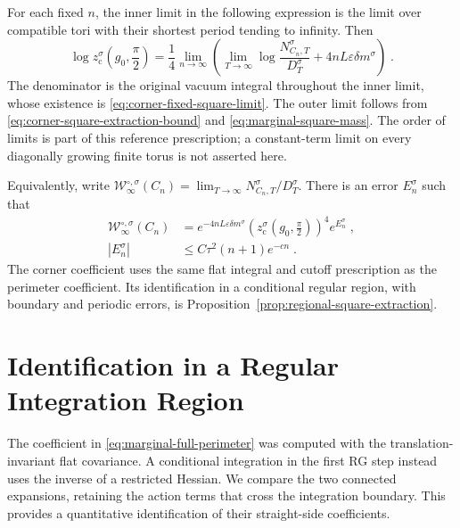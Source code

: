 \documentclass[11pt]{article}
\begin{document}
For each fixed $n$, the inner limit in the following expression is the limit over compatible tori with their shortest period tending to infinity. Then
\begin{equation}\label{eq:corner-ratio-limit}
    \boxed{\displaystyle
        \log z_{\mathrm c}^{\sigma}\!\left(g_0,\frac{\pi}{2}\right)
            =\frac{1}{4}\lim_{n\to\infty}
                \left(\lim_{T\to\infty}
                    \log\frac{N_{C_n,T}^{\sigma}}{D_T^{\sigma}}
                    +4nL\varepsilon\delta m^{\sigma}\right)}\;.
\end{equation}
The denominator is the original vacuum integral throughout the inner limit, whose existence is \eqref{eq:corner-fixed-square-limit}. The outer limit follows from \eqref{eq:corner-square-extraction-bound} and \eqref{eq:marginal-square-mass}. The order of limits is part of this reference prescription; a constant-term limit on every diagonally growing finite torus is not asserted here.

Equivalently, write $\mathcal W_\infty^{\circ,\sigma}(C_n)=\lim_{T\to\infty}N_{C_n,T}^{\sigma}/D_T^{\sigma}$. There is an error $E_n^{\sigma}$ such that
\begin{equation}\label{eq:corner-reference-matching}
    \begin{aligned}
        \mathcal W_\infty^{\circ,\sigma}(C_n)
            &=e^{-4nL\varepsilon\delta m^{\sigma}}
                \left(z_{\mathrm c}^{\sigma}
                    \!\left(g_0,\frac{\pi}{2}\right)\right)^4
                e^{E_n^{\sigma}}\;,\\
        |E_n^{\sigma}|&\leq C\tau^2(n+1)e^{-cn}\;.
    \end{aligned}
\end{equation}
The corner coefficient uses the same flat integral and cutoff prescription as the perimeter coefficient. Its identification in a conditional regular region, with boundary and periodic errors, is Proposition~\ref{prop:regional-square-extraction}.


\section{Identification in a Regular Integration Region}
\label{sec:regional-identification}

The coefficient in \eqref{eq:marginal-full-perimeter} was computed with the translation-invariant flat covariance. A conditional integration in the first RG step instead uses the inverse of a restricted Hessian. We compare the two connected expansions, retaining the action terms that cross the integration boundary. This provides a quantitative identification of their straight-side coefficients.
\end{document}
